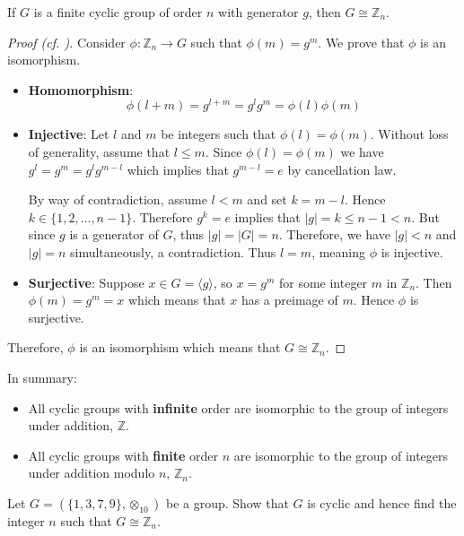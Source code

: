 \begin{theorem}\label{thrm-finite-cyclic-group-isomorphic-to-Zn}
    If $G$ is a finite cyclic group of order $n$ with generator $g$, then $G \cong \mathbb{Z}_n$.
\end{theorem}
\begin{proof}[Proof (cf. {\cite[\S 63]{clark_1984}})]
    Consider $\phi: \mathbb{Z}_n \to G$ such that $\phi(m) = g^m$. We prove that $\phi$ is an isomorphism.
    \begin{itemize}
        \item \textbf{Homomorphism}:
        \[
            \phi(l+m) = g^{l+m} = g^lg^m = \phi(l)\phi(m)
        \]

        \item \textbf{Injective}: Let $l$ and $m$ be integers such that $\phi(l) = \phi(m)$. Without loss of generality, assume that $l \leq m$. Since $\phi(l) = \phi(m)$ we have $g^l = g^m = g^lg^{m-l}$ which implies that $g^{m-l} = e$ by cancellation law.

        By way of contradiction, assume $l < m$ and set $k = m - l$. Hence $k \in \{1, 2,\dots, n-1\}$. Therefore $g^k = e$ implies that $|g| = k \leq n - 1 < n$. But since $g$ is a generator of $G$, thus $|g| = |G| = n$. Therefore, we have $|g| < n$ and $|g| = n$ simultaneously, a contradiction. Thus $l = m$, meaning $\phi$ is injective.

        \item \textbf{Surjective}: Suppose $x \in G = \langle g\rangle$, so $x = g^m$ for some integer $m$ in $\mathbb{Z}_n$. Then $\phi(m) = g^m = x$ which means that $x$ has a preimage of $m$. Hence $\phi$ is surjective.
    \end{itemize}

    Therefore, $\phi$ is an isomorphism which means that $G \cong \mathbb{Z}_n$.
\end{proof}

In summary:
\begin{itemize}
    \item All cyclic groups with \textbf{infinite} order are isomorphic to the group of integers under addition, $\mathbb{Z}$.
    \item All cyclic groups with \textbf{finite} order $n$ are isomorphic to the group of integers under addition modulo $n$, $\mathbb{Z}_n$.
\end{itemize}

\begin{exercise}
    Let $G = (\{1, 3, 7, 9\}, \otimes_{10})$ be a group. Show that $G$ is cyclic and hence find the integer $n$ such that $G \cong \mathbb{Z}_n$.
\end{exercise}

